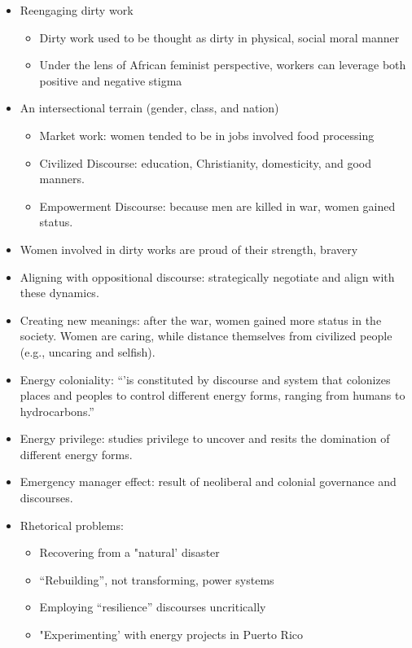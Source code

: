 \documentclass[
]{book}
\begin{document}
\citep{Cruz_2015}

\begin{itemize}
\item
  Reengaging dirty work

  \begin{itemize}
  \item
    Dirty work used to be thought as dirty in physical, social moral manner
  \item
    Under the lens of African feminist perspective, workers can leverage both positive and negative stigma
  \end{itemize}
\item
  An intersectional terrain (gender, class, and nation)

  \begin{itemize}
  \item
    Market work: women tended to be in jobs involved food processing
  \item
    Civilized Discourse: education, Christianity, domesticity, and good manners.
  \item
    Empowerment Discourse: because men are killed in war, women gained status.
  \end{itemize}
\item
  Women involved in dirty works are proud of their strength, bravery
\item
  Aligning with oppositional discourse: strategically negotiate and align with these dynamics.
\item
  Creating new meanings: after the war, women gained more status in the society. Women are caring, while distance themselves from civilized people (e.g., uncaring and selfish).
\end{itemize}

\citep{de_On_s_2018}

\begin{itemize}
\item
  Energy coloniality: ``'is constituted by discourse and system that colonizes places and peoples to control different energy forms, ranging from humans to hydrocarbons.''
\item
  Energy privilege: studies privilege to uncover and resits the domination of different energy forms.
\item
  Emergency manager effect: result of neoliberal and colonial governance and discourses.
\item
  Rhetorical problems:

  \begin{itemize}
  \item
    Recovering from a "natural' disaster
  \item
    ``Rebuilding'', not transforming, power systems
  \item
    Employing ``resilience'' discourses uncritically
  \item
    "Experimenting' with energy projects in Puerto Rico
  \end{itemize}
\end{itemize}
\end{document}
